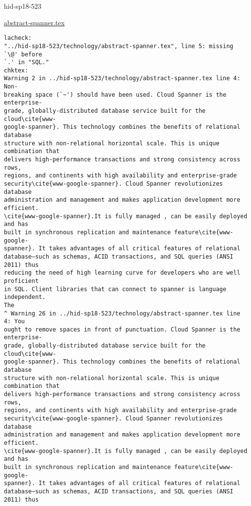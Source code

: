 \begin{IU}

hid-sp18-523

\href{https://github.com/cloudmesh-community/hid-sp18-523/blob/master//technology/abstract-spanner.tex}{abstract-spanner.tex}

\begin{tiny}
\begin{verbatim}
lacheck:
"../hid-sp18-523/technology/abstract-spanner.tex", line 5: missing `\@' before
`.' in "SQL."
chktex:
Warning 2 in ../hid-sp18-523/technology/abstract-spanner.tex line 4: Non-
breaking space (`~') should have been used. Cloud Spanner is the enterprise-
grade, globally-distributed database service built for the cloud\cite{www-
google-spanner}. This technology combines the benefits of relational database
structure with non-relational horizontal scale. This is unique combination that
delivers high-performance transactions and strong consistency across rows,
regions, and continents with high availability and enterprise-grade
security\cite{www-google-spanner}. Cloud Spanner revolutionizes database
administration and management and makes application development more efficient.
\cite{www-google-spanner}.It is fully managed , can be easily deployed and has
built in synchronous replication and maintenance feature\cite{www-google-
spanner}. It takes advantages of all critical features of relational
database—such as schemas, ACID transactions, and SQL queries (ANSI 2011) thus
reducing the need of high learning curve for developers who are well proficient
in SQL. Client libraries that can connect to spanner is language independent.
The
^ Warning 26 in ../hid-sp18-523/technology/abstract-spanner.tex line 4: You
ought to remove spaces in front of punctuation. Cloud Spanner is the enterprise-
grade, globally-distributed database service built for the cloud\cite{www-
google-spanner}. This technology combines the benefits of relational database
structure with non-relational horizontal scale. This is unique combination that
delivers high-performance transactions and strong consistency across rows,
regions, and continents with high availability and enterprise-grade
security\cite{www-google-spanner}. Cloud Spanner revolutionizes database
administration and management and makes application development more efficient.
\cite{www-google-spanner}.It is fully managed , can be easily deployed and has
built in synchronous replication and maintenance feature\cite{www-google-
spanner}. It takes advantages of all critical features of relational
database—such as schemas, ACID transactions, and SQL queries (ANSI 2011) thus

\end{verbatim}
\end{tiny}
\end{IU}
